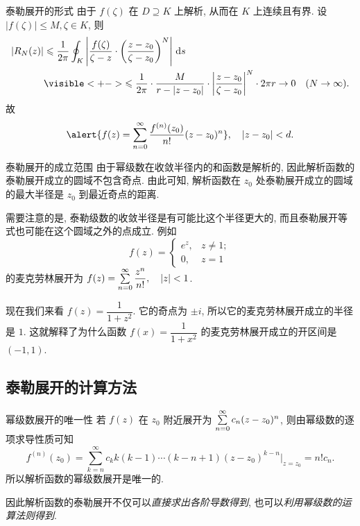 \begin{frame}{泰勒展开的形式}
	\onslide<+->
	由于 $f(\zeta)$ 在 $D\supseteq K$ 上解析, 从而在 $K$ 上连续且有界.
	\onslide<+->
	设 $|f(\zeta)|\le M,\zeta\in K$,
	\onslide<+->
	则
	\begin{align*}
		|R_N(z)|&\le\frac 1{2\pi}\oint_K\abs{\frac{f(\zeta)}{\zeta-z}\cdot\left(\frac{z-z_0}{\zeta-z_0}\right)^N}\diff s\\
		&\visible<+->{\le\frac 1{2\pi}\cdot \frac M{r-|z-z_0|}\cdot\abs{\frac{z-z_0}{\zeta-z_0}}^N\cdot 2\pi r\to 0\quad (N\to\infty).}
	\end{align*}
	\onslide<+->
	故
	\[\alert{f(z)=\sum_{n=0}^\infty\frac{f^{(n)}(z_0)}{n!}(z-z_0)^n},\quad |z-z_0|<d.\]
\end{frame}


\begin{frame}{泰勒展开的成立范围}
	\onslide<+->
	由于幂级数在收敛半径内的和函数是解析的, 因此解析函数的泰勒展开成立的圆域不包含奇点.
	\onslide<+->
	由此可知, 解析函数在 $z_0$ 处\alert{泰勒展开成立的圆域的最大半径是 $z_0$ 到最近奇点的距离}.

	\onslide<+->
	需要注意的是, 泰勒级数的收敛半径是有可能比这个半径更大的,
	\onslide<+->
	而且泰勒展开等式也可能在这个圆域之外的点成立.
	\onslide<+->
	例如 
	\[f(z)=\begin{cases}
	e^z,&z\neq 1;\\ 0,&z=1
	\end{cases}\]
	的麦克劳林展开为 $f(z)=\sum\limits_{n=0}^\infty \dfrac{z^n}{n!},\quad |z|<1$.

	\onslide<+->
	现在我们来看 $f(z)=\dfrac1{1+z^2}$.
	\onslide<+->
	它的奇点为 $\pm i$, 所以它的麦克劳林展开成立的半径是 $1$.
	\onslide<+->
	这就解释了为什么函数 $f(x)=\dfrac1{1+x^2}$ 的麦克劳林展开成立的开区间是 $(-1,1)$.
\end{frame}


\subsection{泰勒展开的计算方法}
\begin{frame}{幂级数展开的唯一性}
	\onslide<+->
	若 $f(z)$ 在 $z_0$ 附近展开为 $\sum\limits_{n=0}^\infty c_n(z-z_0)^n$,
	\onslide<+->
	则由幂级数的逐项求导性质可知
	\[f^{(n)}(z_0)=\sum_{k=n}^\infty c_k k(k-1)\cdots(k-n+1)(z-z_0)^{k-n}\Big|_{z=z_0}=n!c_n.\]
	\onslide<+->
	所以\alert{解析函数的幂级数展开是唯一的}.

	\onslide<+->
	因此解析函数的泰勒展开不仅可以\emph{直接求出各阶导数得到}, 也可以\emph{利用幂级数的运算法则得到}.
\end{frame}


